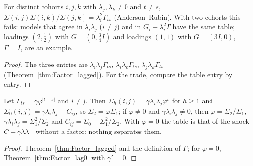 \begin{theorem}\label{thm:Factor_three}
  \leanok
  For distinct cohorts $i, j, k$ with $\lambda_j, \lambda_k \ne 0$ and $t \ne s$,
  $\Sigma(i,j)\Sigma(i,k)/\Sigma(j,k) = \lambda_i^2\Gamma_{ts}$ (Anderson--Rubin). With two
  cohorts this fails: models that agree in $\lambda_i\lambda_j$ ($i \ne j$) and in
  $G_i + \lambda_i^2\Gamma$ have the same table; loadings $(2, \tfrac12)$ with $G = (0, \tfrac34 I)$
  and loadings $(1, 1)$ with $G = (3I, 0)$, $\Gamma = I$, are an example.
\end{theorem}
\begin{proof}
  \leanok
  The three entries are $\lambda_i\lambda_j\Gamma_{ts}$, $\lambda_i\lambda_k\Gamma_{ts}$,
  $\lambda_j\lambda_k\Gamma_{ts}$ (Theorem~\ref{thm:Factor_lagged}). For the trade, compare the
  table entry by entry.
\end{proof}

\begin{theorem}\label{thm:Factor_ar1_id}
  \leanok
  Let $\Gamma_{ts} = \gamma\varphi^{|t-s|}$ and $i \ne j$. Then
  $\Sigma_h(i,j) = \gamma\lambda_i\lambda_j\varphi^h$ for $h \ge 1$ and
  $\Sigma_0(i,j) = \gamma\lambda_i\lambda_j + C_{ij}$, so $\Sigma_2 = \varphi\Sigma_1$; if
  $\varphi \ne 0$ and $\gamma\lambda_i\lambda_j \ne 0$, then $\varphi = \Sigma_2/\Sigma_1$,
  $\gamma\lambda_i\lambda_j = \Sigma_1^2/\Sigma_2$ and $C_{ij} = \Sigma_0 - \Sigma_1^2/\Sigma_2$.
  With $\varphi = 0$ the table is that of the shock $C + \gamma\lambda\lambda^\top$ without a
  factor: nothing separates them.
\end{theorem}
\begin{proof}
  \leanok
  Theorem~\ref{thm:Factor_lagged} and the definition of $\Gamma$; for $\varphi = 0$,
  Theorem~\ref{thm:Factor_lag0} with $\gamma' = 0$.
\end{proof}

